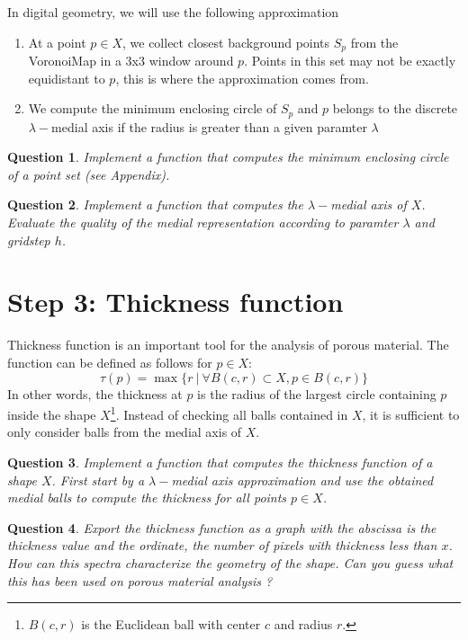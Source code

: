 \documentclass[a4paper, 11pt]{article}
\newtheorem{qu}{Question}
\begin{document}
In digital geometry, we will use the following approximation
\begin{enumerate}
\item At a point $p\in X$, we collect closest background points $S_p$
  from the VoronoiMap in a 3x3 window around $p$. Points in this set
  may not be exactly equidistant to $p$, this is where the approximation comes
  from.
\item We compute the minimum enclosing circle of $S_p$ and $p$ belongs
  to   the discrete $\lambda-$medial axis if the radius is greater
  than a given paramter $\lambda$
\end{enumerate}


\begin{qu}
  Implement a function that computes the minimum enclosing circle of a
  point set (see Appendix).
\end{qu}



\begin{qu}
  Implement a function that computes the $\lambda-$medial axis of
  $X$. Evaluate the quality of the medial representation according to
  paramter $\lambda$ and gridstep $h$.
\end{qu}

\section{Step 3: Thickness function}

Thickness function is an important tool for the analysis of porous
material. The function can be defined as follows for $p\in X$:
\begin{equation}
  \tau(p) = \max \{ r~|~ \forall B(c,r)\subset X, p\in
  B(c,r)\}
\end{equation}
In other words, the thickness at $p$ is the radius of the largest
circle containing $p$ inside the shape $X$\footnote{$B(c,r)$ is the Euclidean ball with center $c$ and
    radius $r$.}. Instead of checking all
balls contained in $X$, it is sufficient to only consider balls from
the medial axis of $X$.

\begin{qu}
  Implement a function that computes the thickness function of a shape
  $X$. First start by a $\lambda-$medial axis approximation and  use
  the obtained medial balls to compute the thickness for all points
  $p\in X$.
\end{qu}


\begin{qu}
  Export the thickness function as a graph with the abscissa is the
  thickness value and the ordinate, the number of pixels with
  thickness less than $x$. How can this spectra characterize the
  geometry of the shape. Can you guess what this has been used on
  porous material analysis ?
\end{qu}
\end{document}
